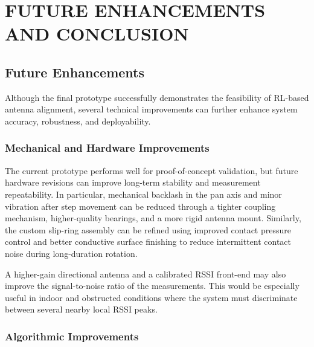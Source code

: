 \newpage
\section{FUTURE ENHANCEMENTS AND CONCLUSION}

\subsection{Future Enhancements}

Although the final prototype successfully demonstrates the feasibility of RL-based
antenna alignment, several technical improvements can further enhance system accuracy,
robustness, and deployability.

\subsubsection{Mechanical and Hardware Improvements}

The current prototype performs well for proof-of-concept validation, but future hardware
revisions can improve long-term stability and measurement repeatability. In particular,
mechanical backlash in the pan axis and minor vibration after step movement can be reduced
through a tighter coupling mechanism, higher-quality bearings, and a more rigid antenna
mount. Similarly, the custom slip-ring assembly can be refined using improved contact
pressure control and better conductive surface finishing to reduce intermittent contact
noise during long-duration rotation.

A higher-gain directional antenna and a calibrated RSSI front-end may also improve the
signal-to-noise ratio of the measurements. This would be especially useful in indoor and
obstructed conditions where the system must discriminate between several nearby local RSSI
peaks.

\subsubsection{Algorithmic Improvements}

